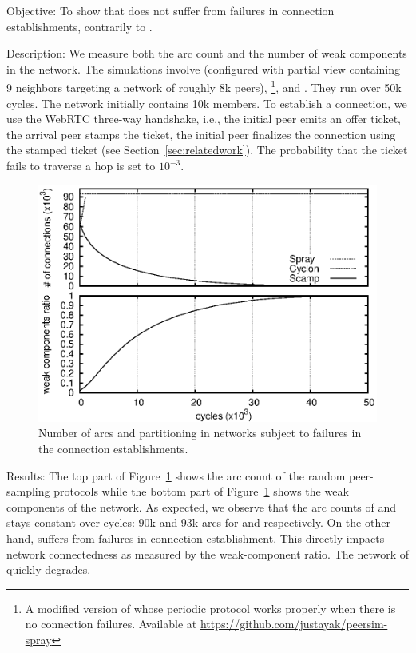 \begin{asparadesc}
\item[Objective:] To show that \SPRAY does not suffer from failures in
  connection establishments, contrarily to \SCAMP.
\item[Description:] We measure both the arc count and the number of weak
  components in the network. The simulations involve \CYCLON (configured with
  partial view containing 9 neighbors targeting a network of roughly 8k
  peers), \SCAMP\footnote{A modified version of \SCAMP whose periodic protocol
    works properly when there is no connection failures. Available at
    \url{https://github.com/justayak/peersim-spray}}, and \SPRAY. They run over
  50k cycles. The network initially contains 10k members.  To establish a
  connection, we use the WebRTC three-way handshake, i.e., the initial peer
  emits an offer ticket, the arrival peer stamps the ticket, the initial peer
  finalizes the connection using the stamped ticket
  (see Section~\ref{sec:relatedwork}). The probability that the ticket fails to
  traverse a hop is set to $10^{-3}$.

\begin{figure}
  \centering \includegraphics[width=\SCALE\textwidth]{img/degen.eps}
  \caption{\label{fig:degeneration}Number of arcs and partitioning in networks
    subject to failures in the connection establishments.}
\end{figure}

\item[Results:] The top part of Figure~\ref{fig:degeneration} shows the arc
  count of the random peer-sampling protocols while the bottom part of
  Figure~\ref{fig:degeneration} shows the weak components of the network.  As
  expected, we observe that the arc counts of \CYCLON and \SPRAY stays constant
  over cycles: 90k and 93k arcs for \CYCLON and \SPRAY respectively. On the
  other hand, \SCAMP suffers from failures in connection establishment. This
  directly impacts network connectedness as measured by the weak-component
  ratio. The network of \SCAMP quickly degrades.


\end{asparadesc}

